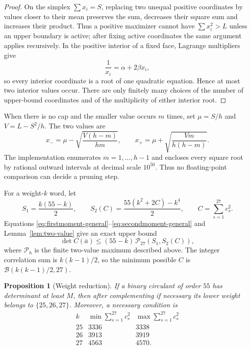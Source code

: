 \documentclass[11pt,a4paper]{article}
\newtheorem{proposition}[theorem]{Proposition}
\theoremstyle{definition}
\theoremstyle{remark}
\begin{document}
\begin{proof}
On the simplex $\sum x_i=S$, replacing two unequal positive coordinates by
values closer to their mean preserves the sum, decreases their square sum and
increases their product.  Thus a positive maximizer cannot have
$\sum x_i^2>L$ unless an upper boundary is active; after fixing active
coordinates the same argument applies recursively.  In the positive interior
of a fixed face, Lagrange multipliers give
\[
  \frac1{x_i}=\alpha+2\beta x_i,
\]
so every interior coordinate is a root of one quadratic equation.  Hence at
most two interior values occur.  There are only finitely many choices of the
number of upper-bound coordinates and of the multiplicity of either interior
root.
\end{proof}

When there is no cap and the smaller value occurs $m$ times, set
$\mu=S/h$ and $V=L-S^2/h$.  The two values are
\begin{equation}
\label{eq:two-values}
 x_- = \mu-\sqrt{\frac{V(h-m)}{hm}},\qquad
 x_+ = \mu+\sqrt{\frac{Vm}{h(h-m)}}.
\end{equation}
The implementation enumerates $m=1,\ldots,h-1$ and encloses every square root
by rational outward intervals at decimal scale $10^{50}$.  Thus no
floating-point comparison can decide a pruning step.

For a weight-$k$ word, let
\[
 S_1=\frac{k(55-k)}2,
 \qquad
 S_2(C)=\frac{55(k^2+2C)-k^4}{2},
 \qquad
 C=\sum_{s=1}^{27}c_s^2.
\]
Equations \eqref{eq:firstmoment-general}--\eqref{eq:secondmoment-general}
and Lemma~\ref{lem:two-value} give an exact upper bound
\[
  \det C(\bar a)
  \le(55-k)\,\mathcal P_{27}(S_1,S_2(C)),
\]
where $\mathcal P_h$ is the finite two-value maximum described above.  The
integer correlation sum is $k(k-1)/2$, so the minimum possible $C$ is
$\mathcal B(k(k-1)/2,27)$.

\begin{proposition}[Weight reduction]
\label{prop:weight-reduction}
If a binary circulant of order $55$ has determinant at least $M$, then after
complementing if necessary its lower weight belongs to $\{25,26,27\}$.
Moreover, a necessary condition is
\[
\begin{array}{c|c|c}
 k & \min\sum_{s=1}^{27}c_s^2 & \max\sum_{s=1}^{27}c_s^2\\
\hline
25&3336&3338\\
26&3913&3919\\
27&4563&4570.
\end{array}
\]
\end{proposition}
\end{document}
